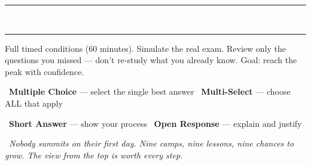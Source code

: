 {\vspace{1mm}
\begin{center}
    \textcolor{alpSunrise!30}{\rule{0.3\linewidth}{0.4pt}}
    \textcolor{alpSunrise!50}{~\faAngleDoubleUp~}
    \textcolor{alpSunrise!30}{\rule{0.3\linewidth}{0.4pt}}
\end{center}
\vspace{1mm}

\noindent
\begin{tcolorbox}[
    enhanced,
    colback=alpCrimson!5,
    colframe=alpCrimson!45,
    arc=4pt, boxrule=1.5pt,
    left=5mm, right=5mm, top=3mm, bottom=3mm,
    title={\textcolor{white}{Summit Push (Tests 7--9)}},
    colbacktitle=alpCrimson!75,
    fonttitle=\bfseries\sffamily,
    borderline west={3pt}{0pt}{alpCrimson!55},
]
    \small
    Full timed conditions (60 minutes). Simulate the real exam.
    Review only the questions you missed --- don't re-study
    what you already know. Goal: reach the peak with confidence.
\end{tcolorbox}

\vspace{3mm}

\begin{tcolorbox}[
    enhanced,
    colback=alpSnow,
    colframe=alpSlate!30,
    arc=6pt, boxrule=0.8pt,
    left=5mm, right=5mm, top=3mm, bottom=3mm,
    title={\small\textcolor{white}{\faClipboardList~Equipment Check}},
    colbacktitle=alpSlate!65,
    fonttitle=\bfseries\sffamily,
]
    \small
    \textcolor{alpPine}{\faFlag}~\textbf{Multiple Choice} --- select the single best answer\hfill
    \textcolor{alpSunrise!90!black}{\faFlag}~\textbf{Multi-Select} --- choose ALL that apply

    \smallskip
    \textcolor{alpCrimson}{\faFlag}~\textbf{Short Answer} --- show your process\hfill
    \textcolor{alpSlate}{\faFlag}~\textbf{Open Response} --- explain and justify
\end{tcolorbox}

\vspace{3mm}

\begin{tcolorbox}[
    enhanced,
    colback=alpIce!15,
    colframe=alpPine!25,
    arc=6pt, boxrule=0.8pt,
    left=5mm, right=5mm, top=3mm, bottom=3mm,
]
    \begin{minipage}[c]{0.07\linewidth}
        \centering \iconOwl[1cm]
    \end{minipage}%
    \hfill
    \begin{minipage}[c]{0.90\linewidth}
        \small\itshape\color{alpSlate}
        \faQuoteLeft~Nobody summits on their first day.
        Nine camps, nine lessons, nine chances to
        grow. The view from the top is worth every step.~\faQuoteRight
    \end{minipage}
\end{tcolorbox}

}

\newpage

